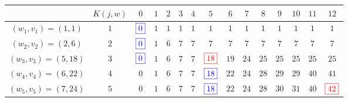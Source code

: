 {\begin{td-sol}[]
		\begin{tabular}{|c|c|c|c|c|c|c|c|c|c|c|c|c|c|c|} %
			\hline %
			\ & \(K(j, w)\) & \(0\) & \(1\) & \(2\) & \(3\) & \(4\) & \(5\) & \(6\) & \(7\) & \(8\) & \(9\) & \(10\) & \(11\) & \(12\) \\
			\hline %
			\((w_1,v_1)=(1, 1)\)  & \(1\) & \(\color{blue}\boxed{0}\) & \(1\) & \(1\) & \(1\) & \(1\) & \(1\) & \(1\) & \(1\) & \(1\) & \(1\) & \(1\) & \(1\) & \(1\) \\
			\hline %
			\((w_2,v_2)=(2, 6)\)  & \(2\) & \(\color{blue}\boxed{0}\) & \(1\) & \(6\) & \(7\) & \(7\) & \(7\) & \(7\) & \(7\) & \(7\) & \(7\) & \(7\) & \(7\) & \(7\) \\
			\hline %
			\((w_3,v_3)=(5, 18)\) & \(3\) & \(\color{blue}\boxed{0}\) & \(1\) & \(6\) & \(7\) & \(7\) & \(\color{red}\boxed{18}\) & \(19\) & \(24\) & \(25\) & \(25\) & \(25\) & \(25\) & \(25\) \\
			\hline %
			\((w_4,v_4)=(6, 22)\) & \(4\) & \(0\) & \(1\) & \(6\) & \(7\) & \(7\) & \(\color{blue}\boxed{18}\) & \(22\) & \(24\) & \(28\) & \(29\) & \(29\) & \(40\) & \(41\) \\
			\hline %
			\((w_5,v_5)=(7, 24)\) & \(5\) & \(0\) & \(1\) & \(6\) & \(7\) & \(7\) & \(\color{blue}\boxed{18}\) & \(22\) & \(24\) & \(28\) & \(30\) & \(31\) & \(40\) & \(\color{red}\boxed{42}\) \\
			\hline %
		\end{tabular}
	\end{td-sol}
}{}
